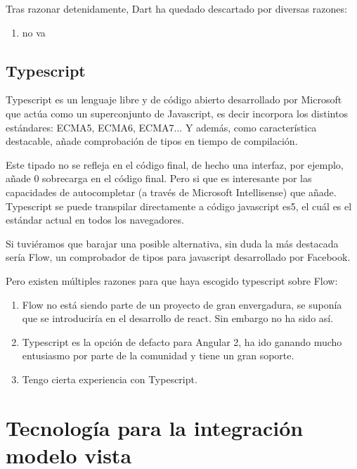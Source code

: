 Tras razonar detenidamente, Dart ha quedado descartado por diversas razones:

\begin{enumerate}
\item no va
\end{enumerate} 

\subsection{Typescript}

Typescript es un lenguaje libre y de código abierto desarrollado por Microsoft que actúa como un superconjunto
de Javascript, es decir incorpora los distintos estándares: ECMA5, ECMA6, ECMA7... Y además, como característica
destacable, añade comprobación de tipos en tiempo de compilación.

\bigskip
Este tipado no se refleja en el código final, de hecho una interfaz, por ejemplo,
añade 0 sobrecarga en el código final. Pero si que es interesante por las capacidades de
autocompletar (a través de Microsoft Intellisense)  que añade. Typescript se puede transpilar 
directamente a código javascript es5, el cuál es el estándar actual en todos los navegadores.    

\bigskip
Si tuviéramos que barajar una posible alternativa, sin duda la más destacada sería Flow, 
un comprobador de tipos para javascript desarrollado por Facebook. 

\bigskip
Pero existen múltiples razones para que haya escogido typescript sobre Flow:

\begin{enumerate}

\item Flow no está siendo parte de un proyecto de gran envergadura, se suponía que
 se introduciría en el desarrollo de react. Sin embargo no ha sido así.

\item Typescript es la opción de defacto para Angular 2, ha ido ganando mucho entusiasmo
 por parte de la comunidad y tiene un gran soporte.

\item Tengo cierta experiencia con Typescript.
\end{enumerate}

\section{Tecnología para la integración modelo vista}
\label{3:sec2}

